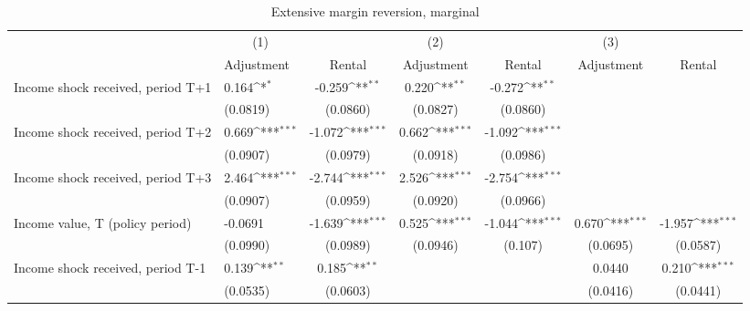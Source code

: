 \begin{table}[htbp]\centering
\def\sym#1{\ifmmode^{#1}\else\(^{#1}\)\fi}
\caption{Extensive margin reversion, marginal}
\begin{tabular}{p{0.8in}l*{5}{c}}
\hline\hline
                    &\multicolumn{1}{c}{(1)}         &                     &\multicolumn{1}{c}{(2)}         &                     &\multicolumn{1}{c}{(3)}         &                     \\
                    &  Adjustment         &      Rental         &  Adjustment         &      Rental         &  Adjustment         &      Rental         \\
\hline
Income shock received, period T+1&       0.164\sym{*}  &      -0.259\sym{**} &       0.220\sym{**} &      -0.272\sym{**} &                     &                     \\
                    &    (0.0819)         &    (0.0860)         &    (0.0827)         &    (0.0860)         &                     &                     \\
Income shock received, period T+2&       0.669\sym{***}&      -1.072\sym{***}&       0.662\sym{***}&      -1.092\sym{***}&                     &                     \\
                    &    (0.0907)         &    (0.0979)         &    (0.0918)         &    (0.0986)         &                     &                     \\
Income shock received, period T+3&       2.464\sym{***}&      -2.744\sym{***}&       2.526\sym{***}&      -2.754\sym{***}&                     &                     \\
                    &    (0.0907)         &    (0.0959)         &    (0.0920)         &    (0.0966)         &                     &                     \\
Income value, T (policy period)&     -0.0691         &      -1.639\sym{***}&       0.525\sym{***}&      -1.044\sym{***}&       0.670\sym{***}&      -1.957\sym{***}\\
                    &    (0.0990)         &    (0.0989)         &    (0.0946)         &     (0.107)         &    (0.0695)         &    (0.0587)         \\
Income shock received, period T-1&       0.139\sym{**} &       0.185\sym{**} &                     &                     &      0.0440         &       0.210\sym{***}\\
                    &    (0.0535)         &    (0.0603)         &                     &                     &    (0.0416)         &    (0.0441)         \\

\end{tabular}
\end{table}
